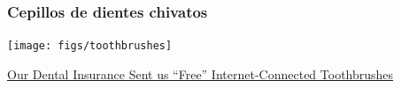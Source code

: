 \documentclass[17pt,aspectratio=169]{beamer}
\begin{document}









\begin{frame}
\frametitle{Cepillos de dientes chivatos}

\begin{center}
\texttt{[image: figs/toothbrushes]}
\end{center}
\begin{flushright}
{\tiny \href{https://wolfstreet.com/2018/04/14/our-dental-insurance-sent-us-free-internet-connected-toothbrushes-and-this-is-what-happened-next/}{Our Dental Insurance Sent us “Free” Internet-Connected Toothbrushes}}
\end{flushright}

\end{frame}
\end{document}
